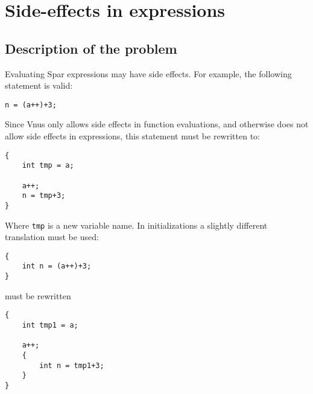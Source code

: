 \documentclass{article}
\begin{document}
\section{Side-effects in expressions}
\subsection{Description of the problem}
Evaluating Spar expressions may have side effects. For example, the following
statement is valid:
\begin{verbatim}
n = (a++)+3;
\end{verbatim}
Since Vnus only allows side effects in function evaluations, and
otherwise does not allow side effects in expressions, this statement
must be rewritten to:
\begin{verbatim}
{
    int tmp = a;

    a++;
    n = tmp+3;
}
\end{verbatim}
Where \verb'tmp' is a new variable name.
In initializations a slightly different translation must be used:
\begin{verbatim}
{
    int n = (a++)+3;
}
\end{verbatim}
must be rewritten
\begin{verbatim}
{
    int tmp1 = a;

    a++;
    {
        int n = tmp1+3;
    }
}
\end{verbatim}
\end{document}
